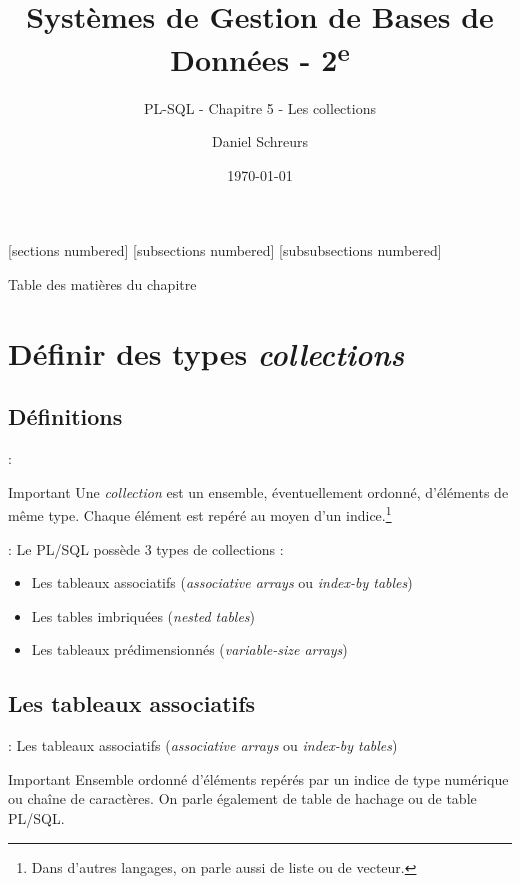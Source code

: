 \documentclass[10pt]{beamer}
\title{Systèmes de Gestion de Bases de Données - 2\textsuperscript{e}}
\subtitle{PL-SQL - Chapitre 5 - Les collections}
\date{\today}
\author{Daniel Schreurs}
\institute{Haute École de Province de Liège}
\begin{document}
\maketitle

[sections numbered]
[subsections numbered]
[subsubsections numbered]
\begin{frame}[allowframebreaks]{Table des matières du chapitre}
    \tableofcontents[subsectionstyle=show/show/hide,subsubsectionstyle=show/show/hide,]
\end{frame}

\section{Définir des types \textit{collections}}
\tocss
\subsection{Définitions}
\begin{frame}{\secname : \subsecname}
    \begin{alertblock}{Important}
        Une \emph{collection} est un ensemble, éventuellement ordonné, d'éléments de même type.
        Chaque élément est repéré au moyen d'un indice.\footnote{Dans d'autres langages, on parle aussi de liste ou de vecteur.}
    \end{alertblock}
\end{frame}

\begin{frame}{\secname : \subsecname}
    Le PL/SQL possède 3 types de collections :
    \begin{itemize}
        \item Les tableaux associatifs (\emph{associative arrays} ou \emph{index-by tables})
        \item Les tables imbriquées (\emph{nested tables})
        \item Les tableaux prédimensionnés (\emph{variable-size arrays})
    \end{itemize}
\end{frame}
\subsection{Les tableaux associatifs}
\begin{frame}{\secname : \subsecname}
    Les tableaux associatifs (\emph{associative arrays} ou \emph{index-by tables})
    \begin{alertblock}{Important}
        Ensemble ordonné d'éléments repérés par un indice de type numérique ou chaîne de caractères. On parle également de table de hachage ou de table PL/SQL.
    \end{alertblock}
\end{frame}
\end{document}
